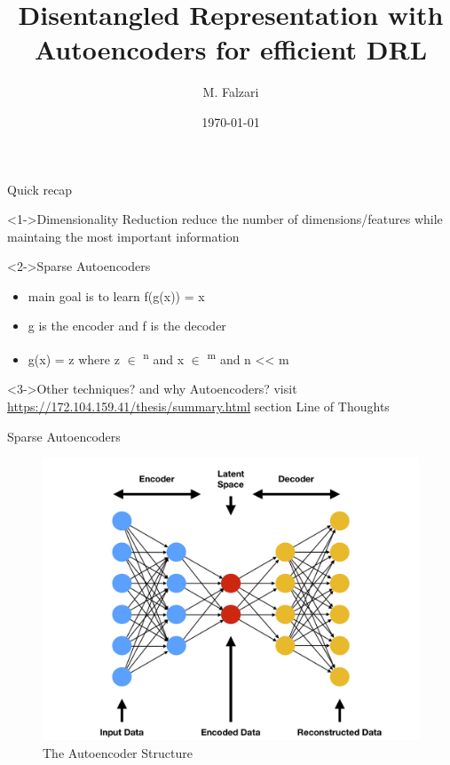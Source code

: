 \documentclass[presentation]{beamer}
\author{M. Falzari}
\date{\today}
\title{Disentangled Representation with Autoencoders for efficient DRL}
\begin{document}
\maketitle
\begin{frame}[label={sec:org188aea2}]{Quick recap}
\begin{block}<1->{Dimensionality Reduction}
reduce the number of dimensions/features while maintaing the most
important information
\end{block}

\begin{block}<2->{Sparse Autoencoders}
\begin{itemize}
\item main goal is to learn f(g(x)) = x
\item g is the encoder and f is the decoder
\item g(x) = z where z \(\in\) \textsuperscript{n} and x \(\in\) \textsuperscript{m}
and n << m
\end{itemize}
\end{block}

\begin{block}<3->{Other techniques? and why Autoencoders?}
visit \url{https://172.104.159.41/thesis/summary.html}
section \alert{Line of Thoughts}
\end{block}
\end{frame}

\begin{frame}[label={sec:org63d1689}]{Sparse Autoencoders}
\begin{figure}[htbp]
\centering
\includegraphics[width=.9\linewidth]{../resources/autoencoder.png}
\caption{The Autoencoder Structure}
\end{figure}
\end{frame}
\end{document}
